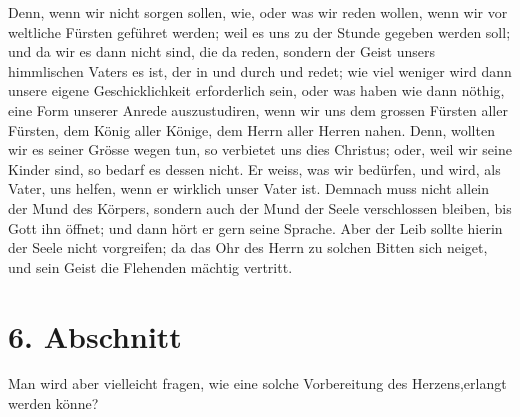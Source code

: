   Denn, wenn wir nicht sorgen sollen, wie, oder was wir reden
wollen, wenn wir vor
weltliche Fürsten
geführet werden; weil es uns zu der Stunde gegeben werden soll; und da wir es
dann nicht sind, die da reden, sondern der Geist unsers himmlischen Vaters es
ist, der in und durch und redet; wie viel weniger wird dann unsere eigene
Geschicklichkeit erforderlich sein, oder was haben wie dann nöthig, eine Form
unserer Anrede
auszustudiren, wenn wir uns dem grossen Fürsten aller Fürsten, dem König aller
Könige, dem Herrn aller Herren nahen. Denn, wollten wir es seiner Grösse wegen
tun, so verbietet uns dies Christus; oder, weil wir seine Kinder sind, so
bedarf es dessen nicht. Er weiss, was wir bedürfen, und wird, als Vater, uns
helfen, wenn er wirklich unser Vater ist. Demnach muss nicht allein der Mund des
Körpers, sondern auch der Mund
der Seele verschlossen bleiben, bis Gott ihn öffnet; und dann hört er gern seine
Sprache. Aber der Leib sollte hierin der Seele nicht vorgreifen; da das Ohr des
Herrn zu solchen Bitten sich neiget, und sein Geist die Flehenden mächtig
vertritt.

\section{6. Abschnitt} \label{kap6_ab6}

Man wird aber vielleicht fragen, wie eine solche Vorbereitung des
Herzens,erlangt werden könne?

\medskip

